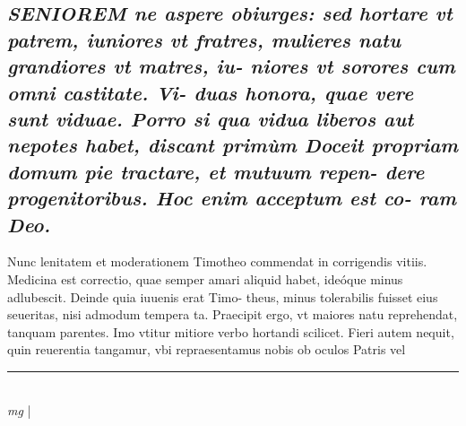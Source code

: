 \documentclass{article}
\begin{document}
\begin{pages}
\subsection*{\textit{\huge\textbf{S}\normalsize ENIOREM ne aspere obiurges: sed hortare vt patrem, iuniores vt fratres, mulieres natu grandiores vt matres, iu- niores vt sorores cum omni castitate. Vi- duas honora, quae vere sunt viduae. Porro si qua vidua liberos aut nepotes habet, discant primùm Doceit propriam domum pie tractare, et mutuum repen- dere progenitoribus. Hoc enim acceptum est co- ram Deo. }}\pstart Nunc lenitatem et moderationem Timotheo commendat in corrigendis vitiis. Medicina est correctio, quae semper amari aliquid habet, ideóque minus adlubescit. Deinde quia iuuenis erat Timo- theus, minus tolerabilis fuisset eius seueritas, nisi admodum tempera ta. Praecipit ergo, vt maiores natu reprehendat, tanquam parentes. Imo vtitur mitiore verbo hortandi scilicet. Fieri autem nequit, quin reuerentia tangamur, vbi repraesentamus nobis ob oculos Patris vel  \pend
\vspace{0.5cm}\noindent
\vspace{0.2cm}\rule{1cm}{0.2pt}\\ 
\hspace{0.2cm}\textit{mg}
\footnotesize 
\normalsize| 

\end{pages}
\end{document}
